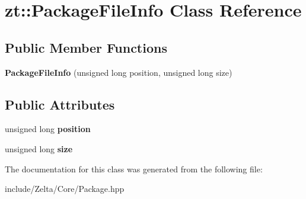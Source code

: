 \hypertarget{classzt_1_1_package_file_info}{}\section{zt\+:\+:Package\+File\+Info Class Reference}
\label{classzt_1_1_package_file_info}
\subsection*{Public Member Functions}
\begin{DoxyCompactItemize}
\item 
\mbox{\label{classzt_1_1_package_file_info_a82366282b45819666d65ba1b13037bba}} 
{\bfseries Package\+File\+Info} (unsigned long position, unsigned long size)
\end{DoxyCompactItemize}
\subsection*{Public Attributes}
\begin{DoxyCompactItemize}
\item 
\mbox{\label{classzt_1_1_package_file_info_ad7514e8e4ecbafa9f4ba0ea1e0c83056}} 
unsigned long {\bfseries position}
\item 
\mbox{\label{classzt_1_1_package_file_info_aaaf8579d1fdb64bc0eb5040bfb967e1f}} 
unsigned long {\bfseries size}
\end{DoxyCompactItemize}


The documentation for this class was generated from the following file\+:\begin{DoxyCompactItemize}
\item 
include/\+Zelta/\+Core/Package.\+hpp\end{DoxyCompactItemize}
